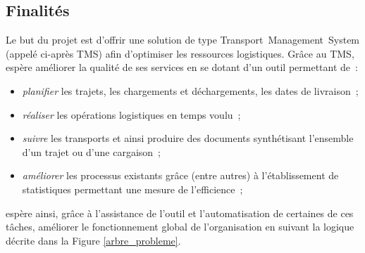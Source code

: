 \subsection{Finalités}
Le but du projet est d'offrir une solution de type Transport~Management~System (appelé ci-après TMS) afin d'optimiser les ressources logistiques. Grâce au TMS, \mo espère améliorer la qualité de ses services en se dotant d'un outil permettant de~:
\begin{itemize}
	\item \emph{planifier} les trajets, les chargements et déchargements, les dates de livraison~;
	\item \emph{réaliser} les opérations logistiques en temps voulu~;
	\item \emph{suivre} les transports et ainsi produire des documents synthétisant l'ensemble d'un trajet ou d'une cargaison~;
	\item \emph{améliorer} les processus existants grâce (entre autres) à l'établissement de statistiques permettant une mesure de l'efficience~;
\end{itemize}
\mo espère ainsi, grâce à l'assistance de l'outil et l'automatisation de certaines de ces tâches, améliorer le fonctionnement global de l'organisation en suivant la logique décrite dans la Figure \ref{arbre_probleme}.

